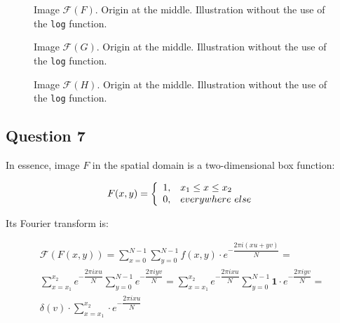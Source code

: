 \begin{minipage}{\linewidth}
  \centering
  \begin{minipage}{0.25\linewidth}
    \begin{figure}[H]
      \scalebox{0.4}{}
      \caption{Image $\mathcal{F}(F)$. Origin at the middle. Illustration without the use of the \texttt{log} function.}
      \label{fig:02.Fhat_c_nl}
    \end{figure}
  \end{minipage}
  \hspace{0.05\linewidth}
  \begin{minipage}{0.25\linewidth}
    \begin{figure}[H]
      \scalebox{0.4}{}
      \caption{Image $\mathcal{F}(G)$. Origin at the middle. Illustration without the use of the \texttt{log} function.}
      \label{fig:02.Ghat_c_nl}
    \end{figure}
  \end{minipage}
  \hspace{0.05\linewidth}
  \begin{minipage}{0.25\linewidth}
    \begin{figure}[H]
      \scalebox{0.4}{}
      \caption{Image $\mathcal{F}(H)$. Origin at the middle. Illustration without the use of the \texttt{log} function.}
      \label{fig:02.Hhat_c_nl}
    \end{figure}
  \end{minipage}
\end{minipage}



\subsection{Question 7}

In essence, image $F$ in the spatial domain is a two-dimensional box function:

\begin{equation}
	F(x,y) = \left\{
	\begin{array}{ c l }
	1, & x_1 \leq x \leq x_2
	\\
	0, & everywhere\ else
	\end{array}
	\right.
\end{equation}

Its Fourier transform is:

\begin{multline}
\mathcal{F}(F(x,y)) = \sum_{x=0}^{N-1} \sum_{y=0}^{N-1} f(x,y) \cdot e^{-\dfrac{2 \pi i (xu + yv)}{N}} = \\
\sum_{x=x_1}^{x_2} e^{-\dfrac{2 \pi i x u}{N}} \sum_{y=0}^{N-1} e^{-\dfrac{2 \pi i yv}{N}} = 
\sum_{x=x_1}^{x_2} e^{-\dfrac{2 \pi i x u}{N}} \sum_{y=0}^{N-1} \mathbf{1} \cdot e^{-\dfrac{2 \pi i yv}{N}} = \\
 \delta(v) \cdot \sum_{x=x_1}^{x_2} \cdot e^{-\dfrac{2 \pi i x u}{N}}
\end{multline}


